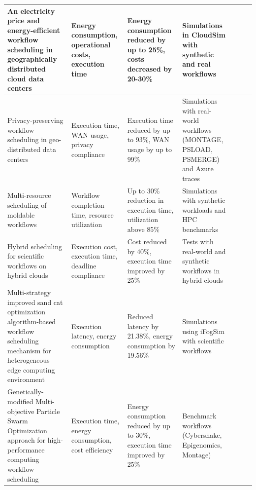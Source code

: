 \documentclass[a4paper, final]{article}
\begin{document}
\begin{table}[H]
\begin{tabularx}{\textwidth}{|p{3.5cm}|X|X|X|X|X|X|}
    An electricity price and energy-efficient workflow scheduling in geographically distributed cloud data centers \cite{bib:5_epee} &
    Energy consumption, operational costs, execution time &
    Energy consumption reduced by up to 25\%, costs decreased by 20-30\% &
    Simulations in CloudSim with synthetic and real workflows \\
    \hline

    Privacy-preserving workflow scheduling in geo-distributed data centers \cite{bib:7_ppps} &
    Execution time, WAN usage, privacy compliance &
    Execution time reduced by up to 93\%, WAN usage by up to 99\% &
    Simulations with real-world workflows (MONTAGE, PSLOAD, PSMERGE) and Azure traces \\
    \hline

    Multi-resource scheduling of moldable workflows \cite{bib:8} &
    Workflow completion time, resource utilization &
    Up to 30\% reduction in execution time, utilization above 85\% &
    Simulations with synthetic workloads and HPC benchmarks \\
    \hline

    Hybrid scheduling for scientific workflows on hybrid clouds \cite{bib:9} &
    Execution cost, execution time, deadline compliance &
    Cost reduced by 40\%, execution time improved by 25\% &
    Tests with real-world and synthetic workflows in hybrid clouds \\
    \hline

    Multi-strategy improved sand cat optimization algorithm-based workflow scheduling mechanism for heterogeneous edge computing environment \cite{bib:3_sandcat} &
    Execution latency, energy consumption &
    Reduced latency by 21.38\%, energy consumption by 19.56\% &
    Simulations using iFogSim with scientific workflows \\
    \hline

    Genetically-modified Multi-objective Particle Swarm Optimization
    approach for high-performance computing workflow scheduling \cite{bib:10} &
    Execution time, energy consumption, cost efficiency &
    Energy consumption reduced by up to 30\%, execution time improved by 25\% &
    Benchmark workflows (Cybershake, Epigenomics, Montage) \\
    \hline
    \end{tabularx}
\end{table}
\end{document}
